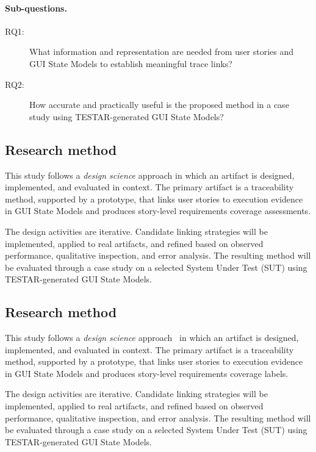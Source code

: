 \paragraph{Sub-questions.}
\begin{description}
    \item[RQ1:] What information and representation are needed from user stories and GUI State Models to establish meaningful trace links?
    \item[RQ2:] How accurate and practically useful is the proposed method in a case study using TESTAR-generated GUI State Models?
\end{description}

\subsection{Research method}
\label{subsec:research-method}

This study follows a \emph{design science} approach in which an artifact is designed, implemented, and evaluated in context. The primary artifact is a traceability method, supported by a prototype, that links user stories to execution evidence in GUI State Models and produces story-level requirements coverage assessments.

The design activities are iterative. Candidate linking strategies will be implemented, applied to real artifacts, and refined based on observed performance, qualitative inspection, and error analysis. The resulting method will be evaluated through a case study on a selected System Under Test (SUT) using TESTAR-generated GUI State Models.

\subsection{Research method}
\label{subsec:research-method}

This study follows a \emph{design science} approach~\citep{peffers2007design} in which an artifact is designed, implemented, and evaluated in context. The primary artifact is a traceability method, supported by a prototype, that links user stories to execution evidence in GUI State Models and produces story-level requirements coverage labels.

The design activities are iterative. Candidate linking strategies will be implemented, applied to real artifacts, and refined based on observed performance, qualitative inspection, and error analysis. The resulting method will be evaluated through a case study on a selected System Under Test (SUT) using TESTAR-generated GUI State Models.

